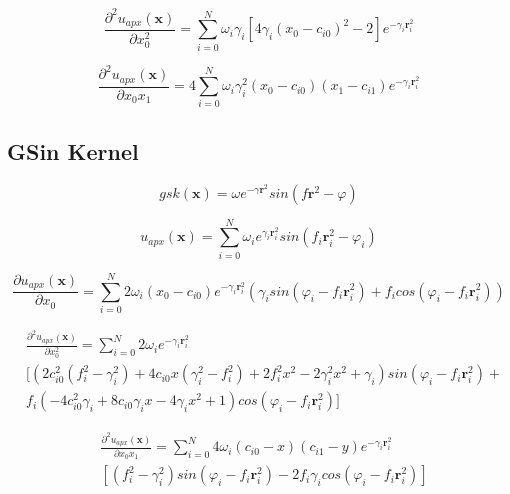 \documentclass[./\jobname.tex]{subfiles}
\begin{document}
\begin{equation}
\label{eq:uapx_gauss_kernel_x0x0}
\frac{\partial^2 u_{apx}(\mathbf{x})}{\partial x_0^2} = \sum_{i=0}^{N} \omega_i \gamma_i \left[ 4 \gamma_i (x_0 - c_{i0})^2 - 2 \right] e^{-\gamma_i \mathbf{r}_i^2}
\end{equation}

\begin{equation}
\label{eq:uapx_gauss_kernel_x0x1}
\frac{\partial^2 u_{apx}(\mathbf{x})}{\partial x_0 x_1} = 4 \sum_{i=0}^{N} \omega_i \gamma_i^2 (x_0 - c_{i0}) (x_1 - c_{i1}) e^{-\gamma_i \mathbf{r}_i^2} 
\end{equation}

\subsection{GSin Kernel}
\label{chap:gsin_kernel}

\begin{equation}
\label{eq:gsin_kernel}
gsk(\mathbf{x}) = \omega e^{-\gamma \mathbf{r}^2} sin(f \mathbf{r}^2 - \varphi)
\end{equation}

\begin{equation}
\label{eq:uapx_gsin_kernel}
u_{apx}(\mathbf{x}) = \sum_{i=0}^{N} \omega_i e^{\gamma_i \mathbf{r}_i^2} sin(f_i \mathbf{r}_i^2 - \varphi_i)
\end{equation}

\begin{equation}
\label{eq:uapx_gsin_kernel_x0}
\frac{\partial u_{apx}(\mathbf{x})}{\partial x_0} = \sum_{i=0}^{N} 2 \omega_i (x_0 - c_{i0}) e^{-\gamma_i \mathbf{r}_i^2} (\gamma_i sin(\varphi_i - f_i \mathbf{r}_i^2) + f_i cos(\varphi_i - f_i \mathbf{r}_i^2))
\end{equation}

\begin{equation}
\label{eq:uapx_gsin_kernel_x0_x0}
\begin{split}
& \frac{\partial^2 u_{apx}(\mathbf{x})}{\partial x_0^2} = \sum_{i=0}^{N} 2 \omega_i e^{-\gamma_i \mathbf{r}_i^2} \\ & [ (2 c_{i0}^2 (f_i^2 - \gamma_i^2) + 4 c_{i0} x (\gamma_i^2 - f_i^2) + 2 f_i^2 x^2 - 2 \gamma_i^2 x^2 + \gamma_i) sin(\varphi_i - f_i \mathbf{r}_i^2) + \\ & f_i (-4 c_{i0}^2 \gamma_i + 8 c_{i0} \gamma_i x - 4 \gamma_i x^2 + 1) cos(\varphi_i - f_i \mathbf{r}_i^2) ]
\end{split}
\end{equation}

\begin{equation}
\label{eq:uapx_gsin_kernel_x0_x1}
\begin{split}
& \frac{\partial^2 u_{apx}(\mathbf{x})}{\partial x_0 x_1} = \sum_{i=0}^{N}  4 \omega_i (c_{i0} - x) (c_{i1} - y) e^{-\gamma_i \mathbf{r}_i^2} \\ & \left[(f_i^2 - \gamma_i^2) sin(\varphi_i - f_i \mathbf{r}_i^2) - 2 f_i \gamma_i cos(\varphi_i - f_i \mathbf{r}_i^2)\right]
\end{split}
\end{equation}
\end{document}
